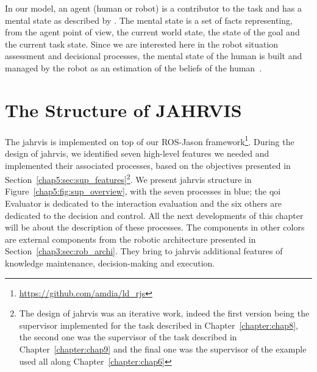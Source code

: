 \documentclass[a4paper,11pt,twoside]{StyleThese}
\begin{document}
In our model, an agent (human or robot) is a contributor to the task and has a mental state as described by \cite{devin_2016_implemented}. The mental state is a set of facts representing, from the agent point of view, the current world state, the state of the goal and the current task state. Since we are interested here in the robot situation assessment and decisional processes, the mental state of the human is built and managed by the robot as an estimation of the beliefs of the human~\citep{milliez_2014_framework, hiatt_2017_modeling,tabrez_2020}.

\section{The Structure of JAHRVIS}\label{chap5:sec:jahrvis}
The \acrfull{jahrvis} is implemented on top of our ROS-Jason framework\footnote{\url{https://github.com/amdia/ld_rjs}}. During the design of \acrshort{jahrvis}, we identified seven high-level features we needed and implemented their associated processes, based on the objectives presented in Section~\ref{chap5:sec:sup_features}\footnote{The design of \acrshort{jahrvis} was an iterative work, indeed the first version being the supervisor implemented for the task described in Chapter~\ref{chapter:chap8}, the second one was the supervisor of the task described in Chapter~\ref{chapter:chap9} and the final one was the supervisor of the example used all along Chapter~\ref{chapter:chap6}}. We present \acrshort{jahrvis} structure in Figure~\ref{chap5:fig:sup_overview}, with the seven processes in blue; the \acrshort{qoi} Evaluator is dedicated to the interaction evaluation and the six others are dedicated to the decision and control. All the next developments of this chapter will be about the description of these processes. The components in other colors are external components from the robotic architecture presented in Section~\ref{chap3:sec:rob_archi}. They bring to \acrshort{jahrvis} additional features of knowledge maintenance, decision-making and execution.
\end{document}
